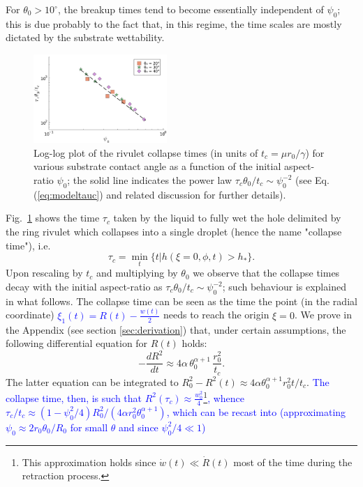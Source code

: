 \documentclass[%
 aip,
 amsmath,amssymb,
 reprint,%
]{revtex4-1}
\begin{document}
For $\theta_0 > 10^{\circ}$, the breakup times tend to become essentially independent of $\psi_0$; this is due probably to the fact that, in this regime, the time scales are mostly dictated by the substrate wettability.\\ 
\begin{figure}
    \centering
    \includegraphics[width = 0.45\textwidth]{psi_0_collapse_thetapow1.pdf}
    \caption{Log-log plot of the rivulet collapse times (in units of $t_c = \mu r_0/\gamma$) for various substrate contact angle as a function of the initial aspect-ratio $\psi_0$; the solid line indicates the power law 
    $\tau_c \theta_0/t_c \sim \psi_0^{-2}$ (see Eq.(\ref{eq:modeltauc}) and related discussion for further details).}
    \label{fig:collapsetimes}
\end{figure}
Fig.~\ref{fig:collapsetimes} shows the time $\tau_c$ taken by the liquid to fully wet the hole delimited by the ring rivulet which collapses into a single droplet (hence the name "collapse time"), i.e. 
\begin{equation}\label{eq:collapsetime}
    \tau_c = \min_t \{t | h(\xi=0,\phi,t) > h_{\ast}\}.
\end{equation}
Upon rescaling by $t_c$ and multiplying by $\theta_0$ we observe that the collapse times decay with the initial aspect-ratio as $\tau_c \theta_0/t_c \sim \psi_0^{-2}$; such behaviour is explained in what follows.
The collapse time can be seen as the time the point (in the radial coordinate)
\textcolor{blue}{$\xi_1(t) = R(t) - \frac{w(t)}{2}$}
needs to reach the origin $\xi = 0$. 
We prove in the Appendix (see section \ref{sec:derivation}) that, under certain assumptions, the following differential equation for $R(t)$ holds:
\begin{equation}\label{eq:modelC4}
    -\frac{d R^2}{dt} \approx 4\alpha \, \theta_0^{\alpha+1} \, \frac{r_0^2}{t_c}.
\end{equation}
The latter equation can be integrated to $R_0^2 - R^2(t) \approx 4 \alpha \theta_0^{\alpha +1} r_0^2 t/t_c$.
\textcolor{blue}{The collapse time, then, is such that  
$R^2(\tau_c) \approx \frac{w_0^2}{4}$\footnote{This approximation holds since $\dot{w}(t) \ll \dot{R}(t)$ most of the time during the retraction process.}, whence 
$\tau_c/t_c  \approx (1-\psi_0^2/4)R_0^2 /(4 \alpha r_0^2 \theta_0^{\alpha+1})$, 
which can be recast into (approximating $\psi_0 \approx 2 r_0 \theta_0/R_0$ for small $\theta$ and since $\psi_0^2/4 \ll 1$)}
\end{document}
